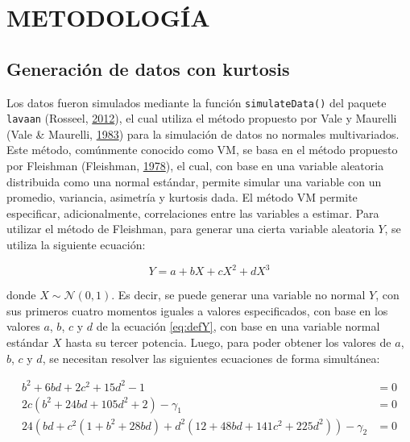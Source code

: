 \documentclass[
]{article}
\begin{document}
\newpage

\section{METODOLOGÍA}

\subsection{Generación de datos con kurtosis}

Los datos fueron simulados mediante la función \texttt{simulateData()}
del paquete \texttt{lavaan} (Rosseel,
\protect\hyperlink{ref-lavaan}{2012}), el cual utiliza el método
propuesto por Vale y Maurelli (Vale \& Maurelli,
\protect\hyperlink{ref-Vale1983}{1983}) para la simulación de datos no
normales multivariados. Este método, comúnmente conocido como VM, se
basa en el método propuesto por Fleishman (Fleishman,
\protect\hyperlink{ref-Fleishman1978}{1978}), el cual, con base en una
variable aleatoria distribuida como una normal estándar, permite simular
una variable con un promedio, variancia, asimetría y kurtosis dada. El
método VM permite especificar, adicionalmente, correlaciones entre las
variables a estimar. Para utilizar el método de Fleishman, para generar
una cierta variable aleatoria \(Y\), se utiliza la siguiente ecuación:

\begin{equation} \label{eq:defY}
  Y = a + bX + cX^2 + d X^3
\end{equation}

donde \(X \sim \mathcal{N} (0,1)\). Es decir, se puede generar una
variable no normal \(Y\), con sus primeros cuatro momentos iguales a
valores especificados, con base en los valores \(a\), \(b\), \(c\) y
\(d\) de la ecuación \ref{eq:defY}, con base en una variable normal
estándar \(X\) hasta su tercer potencia. Luego, para poder obtener los
valores de \(a\), \(b\), \(c\) y \(d\), se necesitan resolver las
siguientes ecuaciones de forma simultánea:

\begin{align*}
  b^2 + 6bd + 2c^2 + 15d^2 -1 & = 0 \\
  2c (b^2 + 24bd + 105d^2 + 2) - \gamma_1 & = 0 \\
  24 \left(bd + c^2 (1 + b^2 + 28bd) + d^2 (12 + 48bd + 141c^2 + 225d^2) \right) - \gamma_2 & = 0
\end{align*}
\end{document}
